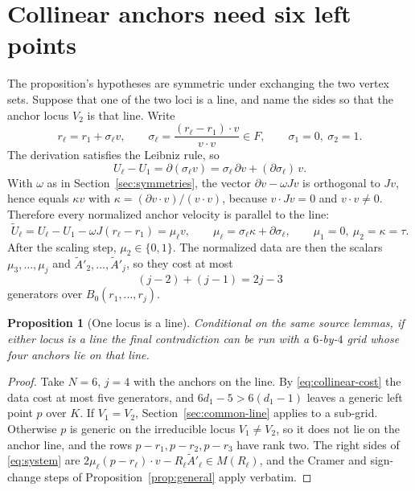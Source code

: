 \documentclass[11pt]{article}
\newtheorem{proposition}{Proposition}
\theoremstyle{remark}
\begin{document}
\section{Collinear anchors need six left points}
\label{sec:collinear}
The proposition's hypotheses are symmetric under exchanging the two
vertex sets. Suppose that one of the two loci is a line, and name the
sides so that the anchor locus $V_2$ is that line. Write
\[
 r_\ell=r_1+\sigma_\ell v,\qquad
 \sigma_\ell=\frac{(r_\ell-r_1)\cdot v}{v\cdot v}\in F,\qquad
 \sigma_1=0,\ \sigma_2=1 .
\]
The derivation satisfies the Leibniz rule, so
\[
 U_\ell-U_1=\partial(\sigma_\ell v)
   =\sigma_\ell\,\partial v+(\partial\sigma_\ell)\,v .
\]
With $\omega$ as in Section~\ref{sec:symmetries}, the vector
$\partial v-\omega Jv$ is orthogonal to $Jv$, hence equals
$\kappa v$ with $\kappa=(\partial v\cdot v)/(v\cdot v)$, because
$v\cdot Jv=0$ and $v\cdot v\ne0$. Therefore every normalized anchor
velocity is parallel to the line:
\begin{equation}\label{eq:parallel}
 \widetilde U_\ell=U_\ell-U_1-\omega J(r_\ell-r_1)
   =\mu_\ell v,\qquad
 \mu_\ell=\sigma_\ell\kappa+\partial\sigma_\ell,\qquad
 \mu_1=0,\ \mu_2=\kappa=\tau .
\end{equation}
After the scaling step, $\mu_2\in\{0,1\}$. The normalized data are then
the scalars $\mu_3,\ldots,\mu_j$ and
$\widetilde A'_2,\ldots,\widetilde A'_j$, so they cost at most
\begin{equation}\label{eq:collinear-cost}
 (j-2)+(j-1)=2j-3
\end{equation}
generators over $B_0(r_1,\ldots,r_j)$.

\begin{proposition}[One locus is a line]
\label{prop:collinear}
Conditional on the same source lemmas, if either locus is a line the
final contradiction can be run with a $6$-by-$4$ grid whose four
anchors lie on that line.
\end{proposition}
\begin{proof}
Take $N=6$, $j=4$ with the anchors on the line. By
\eqref{eq:collinear-cost} the data cost at most five generators, and
$6d_1-5>6(d_1-1)$ leaves a generic left point $p$ over $K$. If
$V_1=V_2$, Section~\ref{sec:common-line} applies to a sub-grid.
Otherwise $p$ is generic on the irreducible locus $V_1\ne V_2$, so it
does not lie on the anchor line, and the rows $p-r_1,p-r_2,p-r_3$ have
rank two. The right sides of \eqref{eq:system} are
$2\mu_\ell(p-r_\ell)\cdot v-R_\ell\widetilde A'_\ell\in M(R_\ell)$, and
the Cramer and sign-change steps of
Proposition~\ref{prop:general} apply verbatim.
\end{proof}
\end{document}
